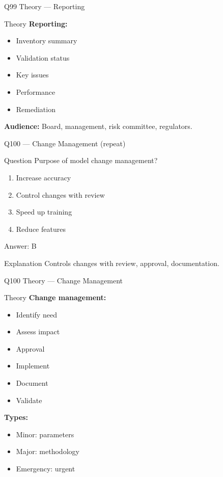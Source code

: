 \documentclass[aspectratio=169,8pt]{beamer}
\begin{document}
	\begin{frame}{Q99 Theory --- Reporting}
		\begin{block}{Theory}
			\textbf{Reporting:}
			\begin{itemize}
				\item Inventory summary
				\item Validation status
				\item Key issues
				\item Performance
				\item Remediation
			\end{itemize}
			\textbf{Audience:} Board, management, risk committee, regulators.
		\end{block}
	\end{frame}
	
	\begin{frame}{Q100 --- Change Management (repeat)}
		\begin{block}{Question}
			Purpose of model change management?
		\end{block}
		\begin{enumerate}[label=\Alph*.]
			\item Increase accuracy
			\item Control changes with review
			\item Speed up training
			\item Reduce features
		\end{enumerate}
		\begin{exampleblock}{Answer: B}
		\end{exampleblock}
		\begin{block}{Explanation}
			Controls changes with review, approval, documentation.
		\end{block}
	\end{frame}
	
	\begin{frame}{Q100 Theory --- Change Management}
		\begin{block}{Theory}
			\textbf{Change management:}
			\begin{itemize}
				\item Identify need
				\item Assess impact
				\item Approval
				\item Implement
				\item Document
				\item Validate
			\end{itemize}
			\textbf{Types:}
			\begin{itemize}
				\item Minor: parameters
				\item Major: methodology
				\item Emergency: urgent
			\end{itemize}
		\end{block}
	\end{frame}
	
\end{document}
